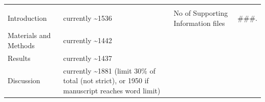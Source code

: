 \documentclass[]{article}
\begin{document}
\begin{longtable}[]{@{}llll@{}}
\begin{minipage}[t]{0.15\columnwidth}
\end{minipage}\tabularnewline
\begin{minipage}[t]{0.35\columnwidth}\raggedright
Introduction\strut
\end{minipage} & \begin{minipage}[t]{0.16\columnwidth}\raggedright
currently \textasciitilde{}1536\strut
\end{minipage} & \begin{minipage}[t]{0.22\columnwidth}\raggedright
No of Supporting Information files\strut
\end{minipage} & \begin{minipage}[t]{0.15\columnwidth}\raggedright
\#\#\#.\strut
\end{minipage}\tabularnewline
\begin{minipage}[t]{0.35\columnwidth}\raggedright
Materials and Methods\strut
\end{minipage} & \begin{minipage}[t]{0.16\columnwidth}\raggedright
currently \textasciitilde{}1442\strut
\end{minipage} & \begin{minipage}[t]{0.22\columnwidth}\raggedright
\strut
\end{minipage} & \begin{minipage}[t]{0.15\columnwidth}\raggedright
\strut
\end{minipage}\tabularnewline
\begin{minipage}[t]{0.35\columnwidth}\raggedright
Results\strut
\end{minipage} & \begin{minipage}[t]{0.16\columnwidth}\raggedright
currently \textasciitilde{}1437\strut
\end{minipage} & \begin{minipage}[t]{0.22\columnwidth}\raggedright
\strut
\end{minipage} & \begin{minipage}[t]{0.15\columnwidth}\raggedright
\strut
\end{minipage}\tabularnewline
\begin{minipage}[t]{0.35\columnwidth}\raggedright
Discussion\strut
\end{minipage} & \begin{minipage}[t]{0.16\columnwidth}\raggedright
currently \textasciitilde{}1881 (limit 30\% of total (not strict), or
1950 if manuscript reaches word limit)\strut
\end{minipage} & \begin{minipage}[t]{0.22\columnwidth}\raggedright

\end{minipage}
\end{longtable}
\end{document}
